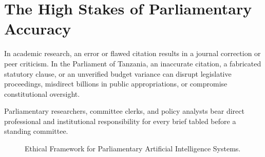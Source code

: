 \documentclass[11pt, a4paper]{report}
\begin{document}
\section{The High Stakes of Parliamentary Accuracy}
In academic research, an error or flawed citation results in a journal correction or peer criticism. In the Parliament of Tanzania, an inaccurate citation, a fabricated statutory clause, or an unverified budget variance can disrupt legislative proceedings, misdirect billions in public appropriations, or compromise constitutional oversight.

Parliamentary researchers, committee clerks, and policy analysts bear direct professional and institutional responsibility for every brief tabled before a standing committee.

\begin{figure}[htbp]
  \centering
  \caption{Ethical Framework for Parliamentary Artificial Intelligence Systems.}
  \label{fig:ethical_pillars}
\end{figure}
\end{document}
